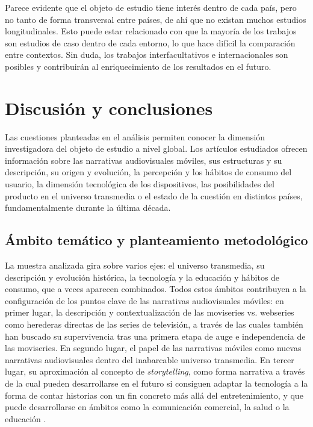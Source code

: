 \documentclass[spanish]{textolivre}
\begin{document}
Parece evidente que el objeto de estudio tiene interés dentro de cada país, pero no tanto de forma transversal entre países, de ahí que no existan muchos estudios longitudinales. Esto puede estar relacionado con que la mayoría de los trabajos son estudios de caso dentro de cada entorno, lo que hace difícil la comparación entre contextos.
Sin duda, los trabajos interfacultativos e internacionales son posibles y contribuirán al enriquecimiento de los resultados en el futuro.

\section{Discusión y conclusiones}
Las cuestiones planteadas en el análisis permiten conocer la dimensión investigadora del objeto de estudio a nivel global. Los artículos estudiados ofrecen información sobre las narrativas audiovisuales móviles, sus estructuras y su descripción, su origen y evolución, la percepción y los hábitos de consumo del usuario, la dimensión tecnológica de los dispositivos, las posibilidades del producto en el universo transmedia o el estado de la cuestión en distintos países, fundamentalmente durante la última década.  

\subsection{Ámbito temático y planteamiento metodológico}
La muestra analizada gira sobre varios ejes: el universo transmedia, su descripción y evolución histórica, la tecnología y la educación y hábitos de consumo, que a veces aparecen combinados. Todos estos ámbitos contribuyen a la configuración de los puntos clave de las narrativas audiovisuales móviles: en primer lugar, la descripción y contextualización de las moviseries vs. webseries como herederas directas de las series de televisión, a través de las cuales también han buscado su supervivencia \cite{adelantadomateu2011} tras una primera etapa de auge e independencia de las moviseries. En segundo lugar, el papel de las narrativas móviles como nuevas narrativas audiovisuales dentro del inabarcable universo transmedia. En tercer lugar, su aproximación al concepto de \emph{storytelling}, como forma narrativa a través de la cual pueden desarrollarse en el futuro si consiguen adaptar la tecnología a la forma de contar historias con un fin concreto más allá del entretenimiento, y que puede desarrollarse en ámbitos como la comunicación comercial, la salud o la educación \cite{lugmayr2017}. 
\end{document}

